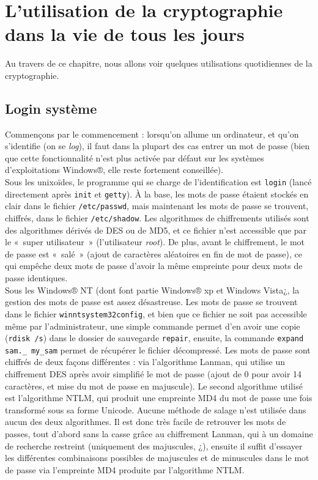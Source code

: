 \section{L'utilisation de la cryptographie dans la vie de tous les
jours}
Au travers de ce chapitre, nous allons voir quelques utilisations
quotidiennes de la cryptographie.
 
\subsection{Login système}
Commençons par le commencement : lorsqu'on allume un ordinateur,
et qu'on s'identifie (on se \emph{log}), il faut dans la plupart
des cas entrer un mot de passe (bien que cette fonctionnalité
n'est plus activée par défaut sur les systèmes d'exploitations
Windows®, elle reste fortement conseillée).
\\
 
Sous les unixoïdes, le programme qui se charge de
l'identification est \texttt{login} (lancé directement après
\texttt{init} et \texttt{getty}). À la base, les mots de passe
étaient stockés en clair dans le fichier \texttt{/etc/passwd},
mais maintenant les mots de passe se trouvent, chiffrés, dans le
fichier \texttt{/etc/shadow}. Les algorithmes de chiffrements
utilisés sont des algorithmes dérivés de DES ou de MD5, et ce
fichier n'est accessible que par le «~super utilisateur~»
(l'utilisateur \emph{root}). De plus, avant le chiffrement, le mot
de passe est «~salé~» (ajout de caractères aléatoires en fin de
mot de passe), ce qui empêche deux mots de passe d'avoir
la même empreinte pour deux mots de passe identiques.
\\
 
Sous les Windows® NT (dont font partie Windows® xp et Windows
Vista¿, la gestion des mots de passe est assez désastreuse. Les
mots de passe se trouvent dans le fichier
\texttt{\bslash winnt\bslash system32\bslash config}, et bien
que ce fichier ne soit pas
accessible même par l'administrateur, une simple commande permet
d'en avoir une copie (\texttt{rdisk /s}) dans le dossier de
sauvegarde \texttt{repair}, ensuite, la commande \texttt{expand
sam.\_ my\_sam}
permet de récupérer le fichier décompressé.
Les mots de passe sont chiffrés de deux façons différentes : via
l'algorithme Lanman, qui utilise un chiffrement DES après avoir
simplifié le mot de passe (ajout de 0 pour avoir 14 caractères, et
mise du mot de passe en majuscule).
Le second algorithme utilisé est l'algorithme NTLM, qui produit
une empreinte MD4 du mot de passe une fois transformé sous sa
forme Unicode. Aucune méthode de salage n'est utilisée dans aucun
des deux algorithmes. Il est donc très facile de retrouver les
mots de passes, tout d'abord sans la casse grâce au chiffrement
Lanman, qui à un domaine de recherche restreint (uniquement des
majuscules, ¿), ensuite il suffit d'essayer les différentes
combinaisons possibles de majuscules et de minuscules dans le mot
de passe via l'empreinte MD4 produite par l'algorithme NTLM.
\\
 
